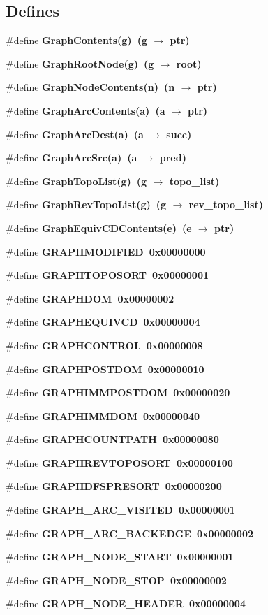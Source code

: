 \subsection*{Defines}
\begin{CompactItemize}
\item 
\#define \bf{Graph\-Contents}(g)~(g $\rightarrow$ ptr)
\item 
\#define \bf{Graph\-Root\-Node}(g)~(g $\rightarrow$ root)
\item 
\#define \bf{Graph\-Node\-Contents}(n)~(n $\rightarrow$ ptr)
\item 
\#define \bf{Graph\-Arc\-Contents}(a)~(a $\rightarrow$ ptr)
\item 
\#define \bf{Graph\-Arc\-Dest}(a)~(a $\rightarrow$ succ)
\item 
\#define \bf{Graph\-Arc\-Src}(a)~(a $\rightarrow$ pred)
\item 
\#define \bf{Graph\-Topo\-List}(g)~(g $\rightarrow$ topo\_\-list)
\item 
\#define \bf{Graph\-Rev\-Topo\-List}(g)~(g $\rightarrow$ rev\_\-topo\_\-list)
\item 
\#define \bf{Graph\-Equiv\-CDContents}(e)~(e $\rightarrow$ ptr)
\item 
\#define \bf{GRAPHMODIFIED}~0x00000000
\item 
\#define \bf{GRAPHTOPOSORT}~0x00000001
\item 
\#define \bf{GRAPHDOM}~0x00000002
\item 
\#define \bf{GRAPHEQUIVCD}~0x00000004
\item 
\#define \bf{GRAPHCONTROL}~0x00000008
\item 
\#define \bf{GRAPHPOSTDOM}~0x00000010
\item 
\#define \bf{GRAPHIMMPOSTDOM}~0x00000020
\item 
\#define \bf{GRAPHIMMDOM}~0x00000040
\item 
\#define \bf{GRAPHCOUNTPATH}~0x00000080
\item 
\#define \bf{GRAPHREVTOPOSORT}~0x00000100
\item 
\#define \bf{GRAPHDFSPRESORT}~0x00000200
\item 
\#define \bf{GRAPH\_\-ARC\_\-VISITED}~0x00000001
\item 
\#define \bf{GRAPH\_\-ARC\_\-BACKEDGE}~0x00000002
\item 
\#define \bf{GRAPH\_\-NODE\_\-START}~0x00000001
\item 
\#define \bf{GRAPH\_\-NODE\_\-STOP}~0x00000002
\item 
\#define \bf{GRAPH\_\-NODE\_\-HEADER}~0x00000004

\end{CompactItemize}
